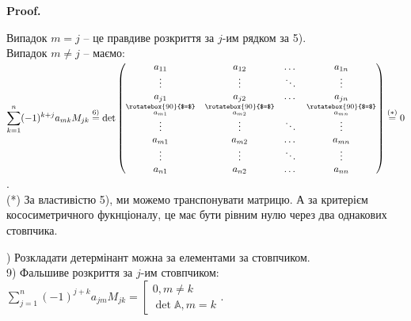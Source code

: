 \documentclass[a4paper, 10pt]{article}
\makeatletter
\theoremstyle{theoremdd}
\renewenvironment{proof}[1][Proof.\\]{\par
\pushQED{\hfill \qed}%
\normalfont \topsep6\p@\@plus6\p@\relax
\trivlist
\item\relax
{\bfseries
#1\@addpunct{.}}\hspace\labelsep\ignorespaces
}{%
\popQED\endtrivlist\@endpefalse
}
\makeatother
\begin{document}
\begin{proof}
Випадок $m = j$ -- це \textquotedbl правдиве\textquotedbl{} розкриття за $j$-им рядком за 5).\\
Випадок $m \neq j$ -- маємо:\\
$\displaystyle \sum_{k=1}^n (-1)^{k+j} a_{mk} M_{jk} \overset{\textrm{6)}}{=} \det \begin{pmatrix}
a_{11} & a_{12} & \dots & a_{1n} \\
\vdots & \vdots & \ddots & \vdots \\
\underset{\substack{\rotatebox{90}{$=$} \\ a_{m1}}}{a_{j1}} & \underset{\substack{\rotatebox{90}{$=$} \\ a_{m2}}}{a_{j2}} & \dots & \underset{\substack{\rotatebox{90}{$=$} \\ a_{mn}}}{a_{jn}} \\
\vdots & \vdots & \ddots & \vdots \\
a_{m1} & a_{m2} & \dots & a_{mn} \\
\vdots & \vdots & \ddots & \vdots \\
a_{n1} & a_{n2} & \dots & a_{nn}
\end{pmatrix} \overset{(*)}{=} 0$.\\
(*) За властивістю 5), ми можемо транспонувати матрицю. А за критерієм кососиметричного фукнціоналу, це має бути рівним нулю через два однакових стовпчика.
\end{proof}

) Розкладати детермінант можна за елементами за стовпчиком.\\
9) \textquotedbl Фальшиве\textquotedbl{} розкриття за $j$-им стовпчиком: $\displaystyle \sum_{j=1}^n (-1)^{j+k} a_{jm}M_{jk} = \left[\begin{gathered} 0, m \neq k \\ \det \mathbb{A}, m = k \end{gathered} \right.$.
\end{document}
